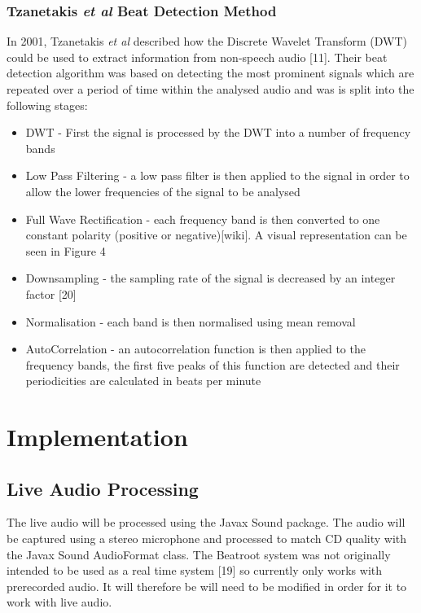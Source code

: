 \documentclass[a4paper, 11pt]{article}
\begin{document}
\subsubsection{Tzanetakis \textit{et al} Beat Detection Method}
In 2001, Tzanetakis \textit{et al} described how the Discrete Wavelet Transform (DWT) could be used to extract information from non-speech audio [11]. Their beat detection algorithm was based on detecting the most prominent signals which are repeated over a period of time within the analysed audio and was is split into the following stages: 

\begin{itemize}
\item DWT - First the signal is processed by the DWT into a number of frequency bands 
\item Low Pass Filtering - a low pass filter is then applied to the signal in order to allow the lower frequencies of the signal to be analysed
\item Full Wave Rectification - each frequency band is then converted to one constant polarity (positive or negative)[wiki]. A visual representation can be seen in Figure 4
\item Downsampling - the sampling rate of the signal is decreased by an integer factor [20]
\item Normalisation - each band is then normalised using mean removal
\item AutoCorrelation - an autocorrelation function is then applied to the frequency bands, the first five peaks of this function are detected and their periodicities are calculated in beats per minute
\end{itemize}





\maketitle{} \section{Implementation}
\subsection{Live Audio Processing}
The live audio will be processed using the Javax Sound package. The audio will be captured using a stereo microphone and processed to match CD quality with the Javax Sound AudioFormat class. The Beatroot system was not originally intended to be used as a real time system [19] so currently only works with prerecorded audio. It will therefore be will need to be modified in order for it to work with live audio. 
\end{document}
